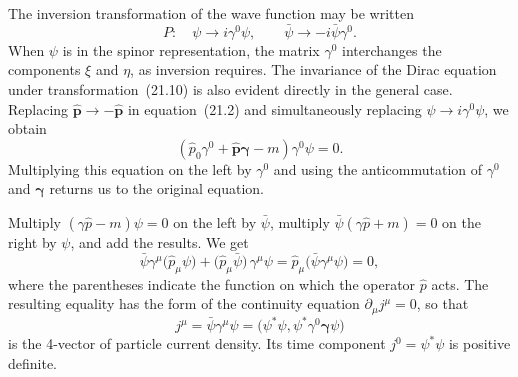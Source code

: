 The inversion transformation of the wave function may be written
\begin{equation}
P:\quad \psi \to i\gamma^0\psi,\qquad \bar\psi \to -i\bar\psi\gamma^0.
\tag{21.10}
\end{equation}
When $\psi$ is in the spinor representation, the matrix $\gamma^0$ interchanges the components $\xi$ and $\eta$, as inversion requires. The invariance
of the Dirac equation under transformation~(21.10) is also evident directly in the general case. Replacing $\widehat{\mathbf{p}} \to -\widehat{\mathbf{p}}$ in equation~(21.2) and simultaneously replacing $\psi \to i\gamma^0\psi$, we obtain
\[
(\widehat p_0\gamma^0 + \widehat{\mathbf{p}}\boldsymbol{\gamma} - m)\gamma^0\psi = 0.
\]
Multiplying this equation on the left by $\gamma^0$ and using the anticommutation of $\gamma^0$ and $\boldsymbol{\gamma}$ returns us to the original equation.

Multiply $(\gamma\widehat p - m)\psi = 0$ on the left by $\bar\psi$, multiply $\bar\psi(\gamma\widehat p + m) = 0$ on the right by $\psi$, and add the results. We get
\[
\bar\psi\gamma^\mu\bigl(\widehat p_\mu\psi\bigr) + \bigl(\widehat p_\mu\bar\psi\bigr)\,\gamma^\mu\psi = \widehat p_\mu\bigl(\bar\psi\gamma^\mu\psi\bigr) = 0,
\]
where the parentheses indicate the function on which the operator $\widehat p$ acts. The resulting equality has the form of the continuity equation $\partial_\mu j^\mu = 0$, so that
\begin{equation}
j^\mu = \bar\psi\gamma^\mu\psi = \bigl(\psi^*\psi, \psi^*\gamma^0\boldsymbol{\gamma}\psi\bigr)
\tag{21.11}
\end{equation}
is the 4-vector of particle current density. Its time component $j^0 = \psi^*\psi$ is positive definite.

